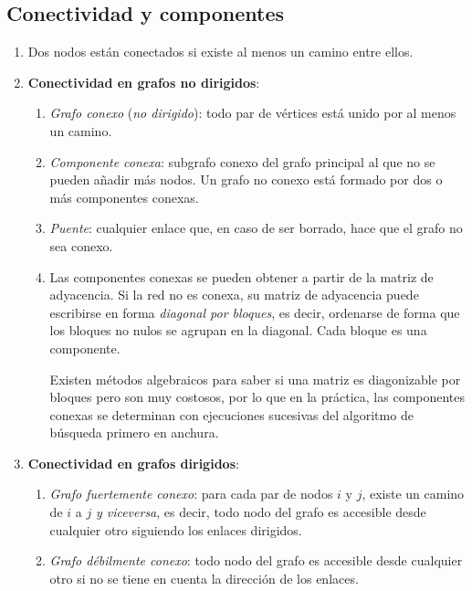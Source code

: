 \documentclass[10pt,spanish, landscape, twocolumn]{article}
\begin{document}
\subsection{\textcolor{temados}Conectividad y componentes}
\begin{enumerate}[\color{temados}{$\spadesuit$}]
    \item Dos nodos están conectados si existe al menos un camino entre ellos.
    \item \textbf{\textcolor{temados}{Conectividad en grafos no dirigidos}}:
    \begin{enumerate}[---]
        \item \textit{\textcolor{temados}{Grafo conexo}} (\textit{\textcolor{temados}{no dirigido}}): todo par de vértices está unido por al menos un camino.
        \item \textit{\textcolor{temados}{Componente conexa}}: subgrafo conexo del grafo principal al que no se pueden añadir más nodos. Un grafo no conexo está formado por dos o más componentes conexas.
        \item \textit{\textcolor{temados}{Puente}}: cualquier enlace que, en caso de ser borrado, hace que el grafo no sea conexo.
        \item Las componentes conexas se pueden obtener a partir de la matriz de adyacencia. Si la red no es conexa, su matriz de adyacencia puede escribirse en forma \textit{\textcolor{temados}{diagonal por bloques}}, es decir, ordenarse de forma que los bloques no nulos se agrupan en la diagonal. Cada bloque es una componente. 

        Existen métodos algebraicos para saber si una matriz es diagonizable por bloques pero son muy costosos, por lo que en la práctica, las componentes conexas se determinan con ejecuciones sucesivas del algoritmo de búsqueda primero en anchura.
    \end{enumerate}
    \item \textbf{\textcolor{temados}{Conectividad en grafos dirigidos}}:
    \begin{enumerate}[---]
        \item \textit{\textcolor{temados}{Grafo fuertemente conexo}}: para cada par de nodos $i$ y $j$, existe un camino de $i$ a $j$ \textit{\textcolor{temados}{y viceversa}}, es decir, todo nodo del grafo es accesible desde cualquier otro siguiendo los enlaces dirigidos.

        \item \textit{\textcolor{temados}{Grafo débilmente conexo}}: todo nodo del grafo es accesible desde cualquier otro si no se tiene en cuenta la dirección de los enlaces.


\end{enumerate}
\end{enumerate}
\end{document}
